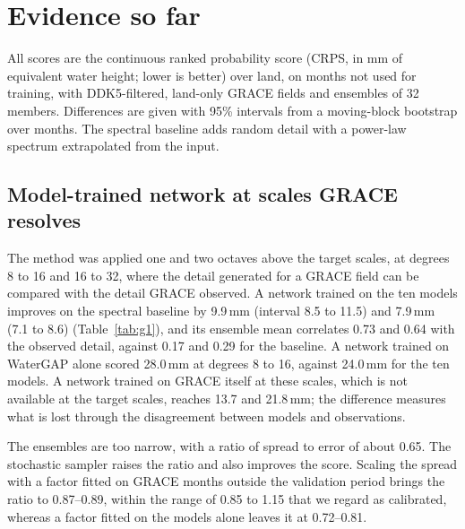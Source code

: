 \documentclass[11pt,a4paper]{article}
\begin{document}
\section{Evidence so far}\label{sec:evidence}

All scores are the continuous ranked probability score (CRPS, in mm of equivalent water
height; lower is better) over land, on months not used for training, with DDK5-filtered,
land-only GRACE fields and ensembles of 32 members. Differences are given with 95\% intervals
from a moving-block bootstrap over months. The spectral baseline adds random detail with a
power-law spectrum extrapolated from the input.

\subsection{Model-trained network at scales GRACE resolves}\label{sec:g1}
The method was applied one and two octaves above the target scales, at degrees 8 to 16 and
16 to 32, where the detail generated for a GRACE field can be compared with the detail GRACE
observed. A network trained on the ten models improves on the spectral baseline by 9.9\,mm
(interval 8.5 to 11.5) and 7.9\,mm (7.1 to 8.6) (Table~\ref{tab:g1}), and its ensemble mean
correlates 0.73 and 0.64 with the observed detail, against 0.17 and 0.29 for the baseline. A
network trained on WaterGAP alone scored 28.0\,mm at degrees 8 to 16, against 24.0\,mm for the
ten models. A network trained on GRACE itself at these scales, which is not available at the
target scales, reaches 13.7 and 21.8\,mm; the difference measures what is lost through the
disagreement between models and observations.

The ensembles are too narrow, with a ratio of spread to error of about 0.65. The stochastic
sampler raises the ratio and also improves the score. Scaling the spread with a factor fitted
on GRACE months outside the validation period brings the ratio to 0.87--0.89, within the range
of 0.85 to 1.15 that we regard as calibrated, whereas a factor fitted on the models alone
leaves it at 0.72--0.81.
\end{document}
